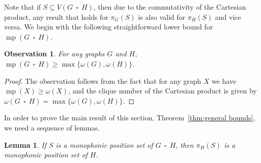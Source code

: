 \documentclass[12pt]{article}
\newtheorem{lemma}[theorem]{Lemma}
\newtheorem{observation}[theorem]{Observation}
\DeclareMathOperator {\mono} {mp}
\DeclareMathOperator{\cp}{\,\square\,}
\begin{document}
Note that if $S\subseteq V(G\cp  H)$, then due to the commutativity of the  Cartesian product, any result that holds for $\pi_{G}(S)$ is also valid for $\pi_{H}(S)$ and vice versa. We begin with the following straightforward lower bound for $\mono (G \cp H)$.

\begin{observation}\label{obs:lower bound}
For any graphs $G$ and $H$, $\mono(G \cp H) \ge \max \{ \omega (G),\omega (H)\}$.
\end{observation}

\begin{proof}
The observation follows from the fact that for any graph $X$ we have $\mono(X)\ge \omega(X)$, and the clique number of the Cartesian product is given by $\omega(G\cp H) = \max\{\omega(G), \omega(H)\}$. 
\end{proof}

In order to prove the main result of this section, Theorem~\ref{thm:general bounds}, we need a sequence of lemmas.

\begin{lemma}
\label{lem:projection is in mp}
If $S$ is a monophonic position set of $G \cp  H$, then $\pi_{H}(S)$ is a monophonic position set of $H$.
\end{lemma}
\end{document}
